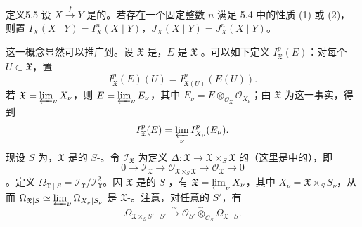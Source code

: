 \begin{SGAresult}{定义}{5.5}
设 $X\xrightarrow fY$ 是的。若存在一个固定整数 $n$ 满足 5.4 中的性质 (1) 或 (2)，
则置 $I_X(X\mid Y)=I_X^n(X\mid Y)$，$J_X(X\mid Y)=J_X^n(X\mid Y)$。
\end{SGAresult}

这一概念显然可以推广到。设 $\mathfrak X$ 是，$E$ 是 $\mathfrak X$-。可以如下定义 $I_{\mathfrak X}^p(E)$：对每个 $U\subset\mathfrak X$，置
\[
I_{\mathfrak X}^p(E)(U)=I_{\mathfrak X(U)}^p(E(U)).
\]
若 $\mathfrak X=\varprojlim_\nu X_\nu$，则 $E=\varprojlim_\nu E_\nu$，其中 $E_\nu=E\otimes_{\mathcal O_{\mathfrak X}}\mathcal O_{X_\nu}$；由 $\mathfrak X$ 为这一事实，得到
\[
I_{\mathfrak X}^p(E)=\varprojlim_\nu I_{X_\nu}^p(E_\nu).
\]
现设 $S$ 为，$\mathfrak X$ 是的 $S$-。令 $\mathcal I_{\mathfrak X}$ 为定义
$\Delta:\mathfrak X\to\mathfrak X\times_S\mathfrak X$ 的（这里是中的），即
\[
0\longrightarrow\mathcal I_{\mathfrak X}\longrightarrow\mathcal O_{\mathfrak X\times_S\mathfrak X}
\longrightarrow\mathcal O_{\mathfrak X}\longrightarrow0
\]
。定义 $\Omega_{\mathfrak X\mid S}=\mathcal I_{\mathfrak X}/\mathcal I_{\mathfrak X}^2$。因 $\mathfrak X$ 是的 $S$-，有 $\mathfrak X=\varprojlim_\nu X_\nu$，其中 $X_\nu=\mathfrak X\times_S S_\nu$，从而 $\Omega_{\mathfrak X\mid S}\simeq\varprojlim_\nu\Omega_{X_\nu\mid S_\nu}$ 是 $\mathfrak X$-。注意，对任意的 $S'$，有
\[
\Omega_{\mathfrak X\times_S S'\mid S'}\xrightarrow\sim
\mathcal O_{S'}\widehat\otimes_{\mathcal O_S}\Omega_{\mathfrak X\mid S}.
\]

